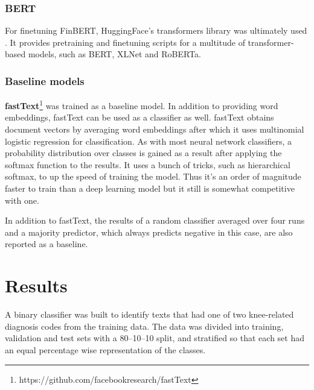 \subsubsection{BERT}\label{BERT}
For finetuning FinBERT, HuggingFace's transformers library was ultimately used \cite{wolf2020}.
It provides pretraining and finetuning scripts for a multitude of transformer-based models, such as BERT, XLNet and RoBERTa.

\subsubsection{Baseline models}\label{Baseline models}
\textbf{fastText}\footnote{https://github.com/facebookresearch/fastText} was trained as a baseline model.
In addition to providing word embeddings, fastText can be used as a classifier as well.
fastText obtains document vectors by averaging word embeddings after which it uses multinomial logistic regression for classification.
As with most neural network classifiers, a probability distribution over classes is gained as a result after applying the softmax function to the results.
It uses a bunch of tricks, such as hierarchical softmax, to up the speed of training the model.
Thus it's an order of magnitude faster to train than a deep learning model but it still is somewhat competitive with one.

In addition to fastText, the results of a random classifier averaged over four runs and a majority predictor, which always predicts negative in this case, are also reported as a baseline.

\section{Results}\label{Results}
A binary classifier was built to identify texts that had one of two knee-related diagnosis codes from the training data.
The data was divided into training, validation and test sets with a 80--10--10 split, and stratified so that each set had an equal percentage wise representation of the classes.

